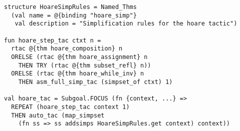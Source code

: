 \documentclass{llncs}
\begin{document}
{
\small
\begin{verbatim}
structure HoareSimpRules = Named_Thms
  (val name = @{binding "hoare_simp"}
   val description = "Simplification rules for the hoare tactic")

fun hoare_step_tac ctxt n =
  rtac @{thm hoare_composition} n
  ORELSE (rtac @{thm hoare_assignment} n
    THEN TRY (rtac @{thm subset_refl} n))
  ORELSE (rtac @{thm hoare_while_inv} n
    THEN asm_full_simp_tac (simpset_of ctxt) 1)

val hoare_tac = Subgoal.FOCUS (fn {context, ...} =>
  REPEAT (hoare_step_tac context 1)
  THEN auto_tac (map_simpset
    (fn ss => ss addsimps HoareSimpRules.get context) context))
\end{verbatim}
}

\end{document}
